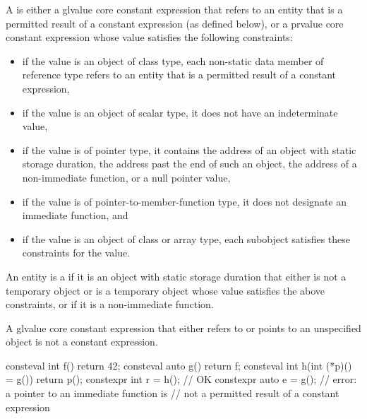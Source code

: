 \pnum
A  is either
a glvalue core constant expression that refers to
an entity that is a permitted result of a constant expression (as defined below), or
a prvalue core constant expression whose value
satisfies the following constraints:
\begin{itemize}
  \item
  if the value is an object of class type,
  each non-static data member of reference type refers to
  an entity that is a permitted result of a constant expression,

  \item
  if the value is an object of scalar type,
  it does not have an indeterminate value,

  \item
  if the value is of pointer type, it contains
  the address of an object with static storage duration,
  the address past the end of such an object,
  the address of a non-immediate function,
  or a null pointer value,

  \item
  if the value is of pointer-to-member-function type,
  it does not designate an immediate function, and

  \item
  if the value is an object of class or array type,
  each subobject satisfies these constraints for the value.
\end{itemize}
An entity is a
if it is an
object with static storage duration that either is not a temporary object or is
a temporary object whose value satisfies the above constraints, or if
it is a non-immediate function.
\begin{note}
A glvalue core constant expression
that either refers to or points to an unspecified object
is not a constant expression.
\end{note}
\begin{example}
\begin{codeblock}
consteval int f() { return 42; }
consteval auto g() { return f; }
consteval int h(int (*p)() = g()) { return p(); }
constexpr int r = h();                          // OK
constexpr auto e = g();                         // error: a pointer to an immediate function is
                                                // not a permitted result of a constant expression
\end{codeblock}
\end{example}

